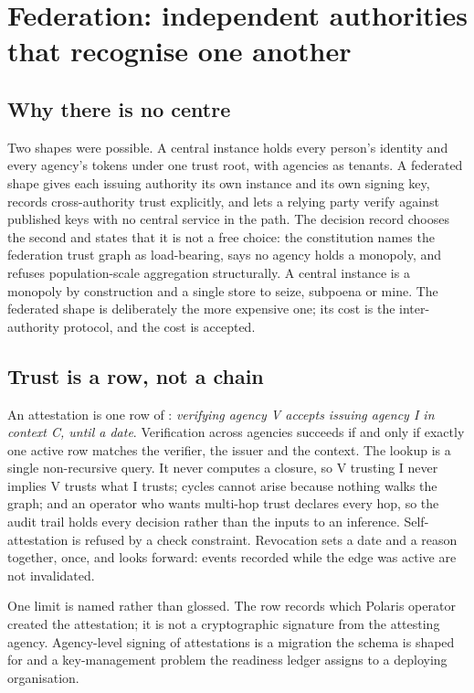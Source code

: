 \section{Federation: independent authorities that recognise one another}
\label{sec:federation}

\subsection{Why there is no centre}

Two shapes were possible. A central instance holds every person's identity and every agency's
tokens under one trust root, with agencies as tenants. A federated shape gives each issuing
authority its own instance and its own signing key, records cross-authority trust explicitly, and
lets a relying party verify against published keys with no central service in the path. The
decision record chooses the second and states that it is not a free choice: the constitution names
the federation trust graph as load-bearing, says no agency holds a monopoly, and refuses
population-scale aggregation structurally. A central instance is a monopoly by construction and a
single store to seize, subpoena or mine. The federated shape is deliberately the more expensive one;
its cost is the inter-authority protocol, and the cost is accepted. \sImpl

\subsection{Trust is a row, not a chain}

An attestation is one row of : \emph{verifying agency V accepts
issuing agency I in context C, until a date}. Verification across agencies succeeds if and only if
exactly one active row matches the verifier, the issuer and the context. The lookup is a single
non-recursive query. It never computes a closure, so V trusting I never implies V trusts what I
trusts; cycles cannot arise because nothing walks the graph; and an operator who wants multi-hop
trust declares every hop, so the audit trail holds every decision rather than the inputs to an
inference. Self-attestation is refused by a check constraint. Revocation sets a date and a reason
together, once, and looks forward: events recorded while the edge was active are not invalidated.
\sImpl

One limit is named rather than glossed. The row records which Polaris operator created the
attestation; it is not a cryptographic signature from the attesting agency. Agency-level signing of
attestations is a migration the schema is shaped for and a key-management problem the readiness
ledger assigns to a deploying organisation. \sExt

